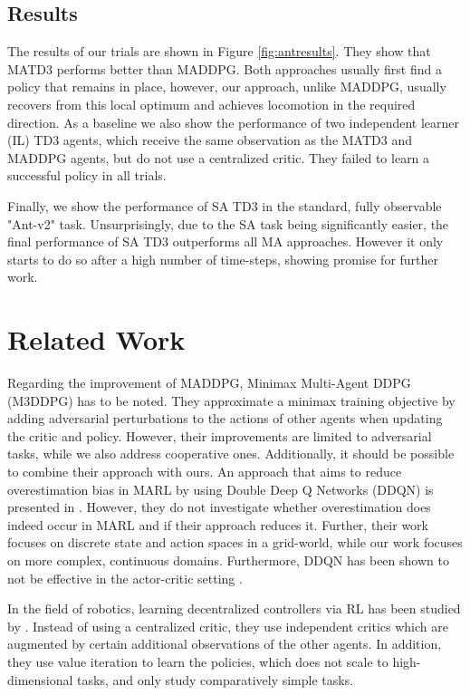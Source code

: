 \documentclass{article}
\begin{document}
\subsection{Results}
\label{sec:robot-eval}

The results of our trials are shown in Figure \ref{fig:antresults}. 
They show that \gls*{MATD3} performs better than \gls*{MADDPG}.
Both approaches usually first find a policy that remains in place, however, our approach, unlike \gls*{MADDPG}, usually recovers from this local optimum and achieves locomotion in the required direction.
As a baseline we also show the performance of two independent learner (IL) \gls*{TD3} agents, which receive the same observation as the \gls*{MATD3} and \gls*{MADDPG} agents, but do not use a centralized critic.
They failed to learn a successful policy in all trials.

Finally, we show the performance of SA TD3 in the standard, fully observable "Ant-v2" task.
Unsurprisingly, due to the SA task being significantly easier, the final performance of SA TD3 outperforms all MA approaches.
However it only starts to do so after a high number of time-steps, showing promise for further work.

\vspace{-1.5mm}
\section{Related Work}
\vspace{-1.5mm}
Regarding the improvement of \gls*{MADDPG}, Minimax Multi-Agent DDPG (M3DDPG) \cite{Li2019} has to be noted.
They approximate a minimax training objective by adding adversarial perturbations to the actions of other agents when updating the critic and policy.
However, their improvements are limited to adversarial tasks, while we also address cooperative ones.
Additionally, it should be possible to combine their approach with ours.
An approach that aims to reduce overestimation bias in \gls*{MARL} by using Double Deep Q Networks (DDQN) is presented in \cite{Simoes2017}. 
However, they do not investigate whether overestimation does indeed occur in \gls*{MARL} and if their approach reduces it.
Further, their work focuses on discrete state and action spaces in a grid-world, while our work focuses on more complex, continuous domains.
Furthermore, DDQN has been shown to not be effective in the actor-critic setting \cite{Fujimoto2018}.

In the field of robotics, learning decentralized controllers via \gls*{RL} has been studied by \cite{Busoniu2006}. 
Instead of using a centralized critic, they use independent critics which are augmented by certain additional observations of the other agents. 
In addition, they use value iteration to learn the policies, which does not scale to high-dimensional tasks, and only study comparatively simple tasks.
\vspace{-1.5mm}
\glsresetall
\end{document}
